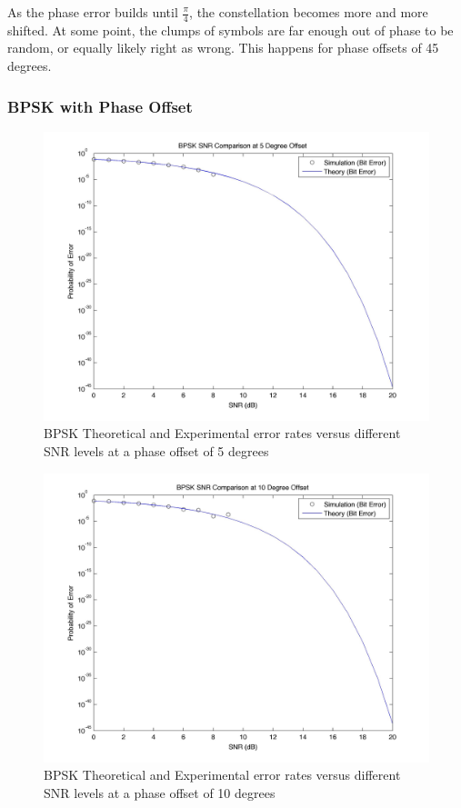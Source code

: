 \documentclass[]{article}
\begin{document}
As the phase error builds until $\frac{\pi}{4}$, the constellation becomes more and more shifted.  At some point, the clumps of symbols are far enough out of phase to be random, or equally likely right as wrong.  This happens for phase offsets of 45 degrees.
\subsubsection{BPSK with Phase Offset}
\label{sec:bpsk_phase}
\begin{figure}[H]
\centering
\hspace*{-2cm}\includegraphics[width=1.3\textwidth]{bpSNRpo1.jpg}
\caption{BPSK Theoretical and Experimental error rates versus different SNR levels at a phase offset of 5 degrees }
\end{figure}

\begin{figure}[H]
\centering
\hspace*{-2cm}\includegraphics[width=1.3\textwidth]{bpSNRpo2.jpg}
\caption{BPSK Theoretical and Experimental error rates versus different SNR levels at a phase offset of 10 degrees }
\end{figure}
\end{document}
